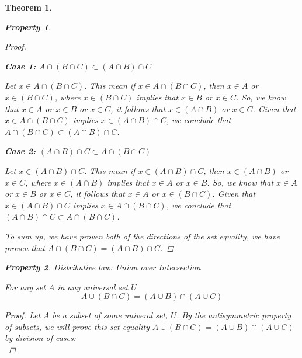 \documentclass{book}
\newtheorem{theorem}{Theorem}[section]
\newtheorem{property}{Property}[theorem]
\theoremstyle{definition}
\theoremstyle{remark}
\begin{document}
\begin{theorem}
\begin{property}
\begin{proof}
            \begin{flushleft} \textbf{Case 1: $A \cap (B \cap C) \subset (A \cap B) \cap C$} \end{flushleft}
                Let $x \in A \cap (B \cap C)$. This mean if $x \in A \cap (B \cap C)$, then $x \in A$ or $x \in (B \cap C)$, where $x \in (B \cap C)$ implies that $x \in B$ or $x \in C$. So, we know that $x \in A$ or $x \in B$ or $x \in C$, it follows that $x \in (A \cap B)$ or $x \in C$. Given that $x \in A \cap (B \cap C)$ implies $x \in (A \cap B) \cap C$, we conclude that $A \cap (B \cap C) \subset (A \cap B) \cap C$.      
            
            \begin{flushleft} \textbf{Case 2: $(A \cap B) \cap C \subset A \cap (B \cap C)$} \end{flushleft} 
                Let $x \in (A \cap B) \cap C$. This mean if $x \in (A \cap B) \cap C$, then $x \in (A \cap B)$ or $x \in C$, where $x \in (A \cap B)$ implies that $x \in A$ or $x \in B$. So, we know that $x \in A$ or $x \in B$ or $x \in C$, it follows that $x \in A$ or $x \in (B \cap C)$. Given that $x \in (A \cap B) \cap C$ implies $x \in A \cap (B \cap C)$, we conclude that $(A \cap B) \cap C \subset A \cap (B \cap C)$. 
            
            To sum up, we have proven both of the directions of the set equality, we have proven that $A \cap (B \cap C) = (A \cap B) \cap C$. 
        \end{proof}
    \end{property}
    
    
    
    
    \newpage
    \begin{property}
    Distributive law: Union over Intersection \\
        \begin{tcolorbox}
            For any set $A$ in any universal set $U$
                \begin{equation*}
                    A \cup (B \cap C) = (A \cup B) \cap (A \cup C)
                \end{equation*}
        \end{tcolorbox}
    
        \begin{proof}
            Let $A$ be a subset of some univeral set, $U$. By the antisymmetric property of subsets, we will prove this set equality $A \cup (B \cap C) = (A \cup B) \cap (A \cup C)$ by division of cases: \\
            

\end{proof}
\end{property}
\end{theorem}
\end{document}
